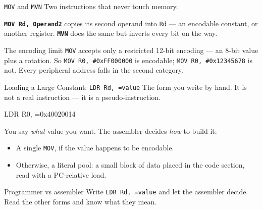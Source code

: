 \documentclass[9pt,aspectratio=169,xcolor=table]{beamer}
\begin{document}
\begin{frame}[fragile]{\texttt{MOV} and \texttt{MVN}}
    \leavevmode
    {\small Two instructions that never touch memory.}

    \vspace{2mm}
    {\small \textbf{\texttt{MOV Rd, Operand2}} copies its second operand
    into \texttt{Rd} --- an encodable constant, or another register.
    \textbf{\texttt{MVN}} does the same but inverts every bit on the way.}

    \vspace{2mm}
    \begin{center}
    \end{center}

    \vspace{2mm}
    \begin{block}{The encoding limit}
        \texttt{MOV} accepts only a restricted 12-bit encoding --- an 8-bit
        value plus a rotation. So \texttt{MOV R0, \#0xFF000000} is
        encodable; \texttt{MOV R0, \#0x12345678} is \alert{not}. Every
        peripheral address falls in the second category.
    \end{block}
\end{frame}

\begin{frame}[fragile]{Loading a Large Constant: \texttt{LDR Rd, =value}}
    \leavevmode
    {\small The form you write by hand. It is not a real instruction ---
    it is a \alert{pseudo-instruction}.}

    \vspace{2mm}
    \begin{center}
    \begin{asm}[basicstyle=\large\ttfamily]
	LDR R0, =0x40020014
    \end{asm}
    \end{center}

    \vspace{3mm}
    {\small You say \emph{what} value you want. The assembler decides
    \emph{how} to build it:}

    \vspace{1mm}
    {\small
    \begin{itemize}\itemsep1pt
        \item A single \texttt{MOV}, if the value happens to be encodable.
        \item Otherwise, a \alert{literal pool}: a small block of data
              placed in the code section, read with a PC-relative load.
    \end{itemize}}

    \vspace{3mm}
    \begin{block}{Programmer vs assembler}
        Write \texttt{LDR Rd, =value} and let the assembler decide. Read
        the other forms and know what they mean.
    \end{block}
\end{frame}
\end{document}
